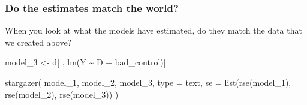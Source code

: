 \documentclass[
]{article}
\newenvironment{Shaded}{\begin{snugshade}}{\end{snugshade}}
\newcommand{\AttributeTok}[1]{\textcolor[rgb]{0.77,0.63,0.00}{#1}}
\newcommand{\FunctionTok}[1]{\textcolor[rgb]{0.00,0.00,0.00}{#1}}
\newcommand{\NormalTok}[1]{#1}
\newcommand{\OtherTok}[1]{\textcolor[rgb]{0.56,0.35,0.01}{#1}}
\newcommand{\SpecialCharTok}[1]{\textcolor[rgb]{0.00,0.00,0.00}{#1}}
\newcommand{\StringTok}[1]{\textcolor[rgb]{0.31,0.60,0.02}{#1}}
\begin{document}
\hypertarget{do-the-estimates-match-the-world}{%
\subsubsection{Do the estimates match the world?}\label{do-the-estimates-match-the-world}}

When you look at what the models have estimated, do they match the data that we created above?

\begin{Shaded}
\begin{Highlighting}[]
\NormalTok{model\_3 }\OtherTok{\textless{}{-}}\NormalTok{ d[ , }\FunctionTok{lm}\NormalTok{(Y }\SpecialCharTok{\textasciitilde{}}\NormalTok{ D }\SpecialCharTok{+}\NormalTok{ bad\_control)]}
\end{Highlighting}
\end{Shaded}

\begin{Shaded}
\begin{Highlighting}[]
\FunctionTok{stargazer}\NormalTok{(}
\NormalTok{  model\_1, model\_2, model\_3,}
  \AttributeTok{type =} \StringTok{\textquotesingle{}text\textquotesingle{}}\NormalTok{, }
  \AttributeTok{se =} \FunctionTok{list}\NormalTok{(}\FunctionTok{rse}\NormalTok{(model\_1), }\FunctionTok{rse}\NormalTok{(model\_2), }\FunctionTok{rse}\NormalTok{(model\_3))}
\NormalTok{)}
\end{Highlighting}
\end{Shaded}
\end{document}
